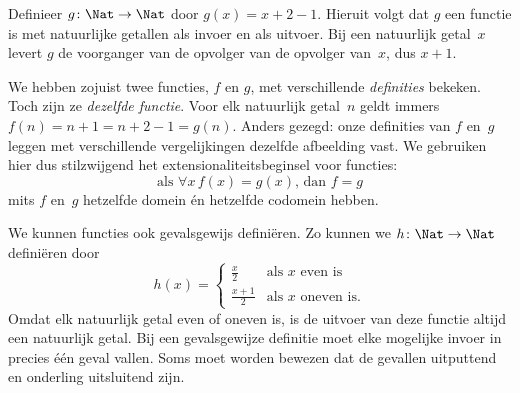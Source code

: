 \documentclass[openany]{memoir}
\begin{document}
\begin{ex}
Definieer $g \colon \Nat \to \Nat$ door $g(x) = x+2-1$. Hieruit volgt dat
$g$ een functie is met natuurlijke getallen als invoer en als uitvoer. Bij een
natuurlijk getal~$x$ levert $g$ de voorganger van de opvolger van de opvolger
van~$x$, dus $x+1$.
\end{ex}

\begin{explain}
We hebben zojuist twee functies, $f$ en $g$, met verschillende
\emph{definities} bekeken. Toch zijn ze \emph{dezelfde functie}. Voor elk
natuurlijk getal~$n$ geldt immers $f(n) = n+1 = n+2-1 =
g(n)$. Anders gezegd: onze definities van $f$ en~$g$ leggen met verschillende
vergelijkingen dezelfde afbeelding vast. We gebruiken hier dus stilzwijgend
het extensionaliteitsbeginsel voor functies:
\[
  \text{als }\forall x\, f(x) = g(x)\text{, dan }f = g
\]
mits $f$ en~$g$ hetzelfde domein én hetzelfde codomein hebben.
\end{explain}

\begin{ex}
We kunnen functies ook gevalsgewijs definiëren. Zo kunnen we
$h \colon \Nat \to \Nat$ definiëren door
\[
h(x) =
\begin{cases}
  \frac{x}{2} & \text{als $x$ even is} \\
  \frac{x+1}{2} & \text{als $x$ oneven is.}
\end{cases}
\]
Omdat elk natuurlijk getal even of oneven is, is de uitvoer van deze functie
altijd een natuurlijk getal. Bij een gevalsgewijze definitie moet elke
mogelijke invoer in precies één geval vallen. Soms moet worden bewezen dat de
gevallen uitputtend en onderling uitsluitend zijn.
\end{ex}
\endgroup

\begingroup
\def\olfilename{OLP-0022}
\def\olfilepath{content/sets-functions-relations/functions/}
\hypertarget{unit-OLP-0022}{}



\end{document}
